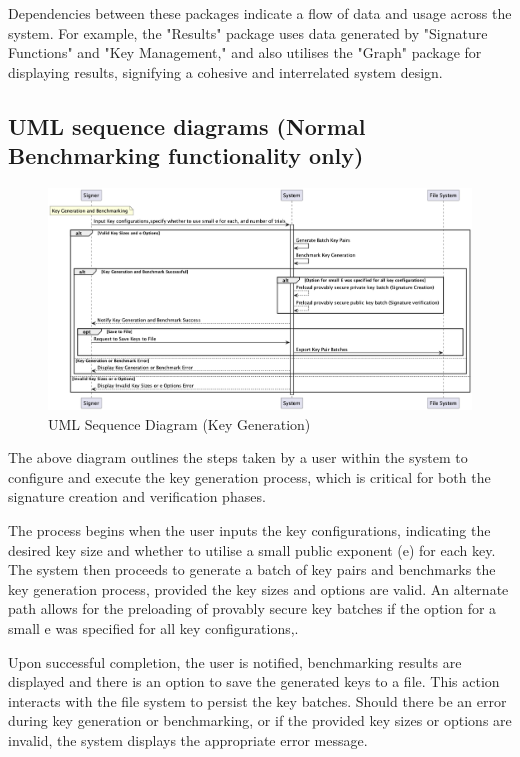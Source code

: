 \documentclass[]{final_report}
\theoremstyle{definition}
\begin{document}
Dependencies between these packages indicate a flow of data and usage across the system. For example, the "Results" package uses data generated by "Signature Functions" and "Key Management," and also utilises the "Graph" package for displaying results, signifying a cohesive and interrelated system design.


\subsection{UML sequence diagrams (Normal Benchmarking functionality only)}
\begin{figure}[H]
    \centering
    \includegraphics[scale=0.42]{main_pictures/sequenceKey.png}
    \caption{UML Sequence Diagram (Key Generation)}
    \label{fig:uc}
\end{figure}

The above diagram outlines the steps taken by a user within the system to configure and execute the key generation process, which is critical for both the signature creation and verification phases.

The process begins when the user inputs the key configurations, indicating the desired key size and whether to utilise a small public exponent (e) for each key. The system then proceeds to generate a batch of key pairs and benchmarks the key generation process, provided the key sizes and options are valid. An alternate path allows for the preloading of provably secure key batches if the option for a small e was specified for all key configurations,.

Upon successful completion, the user is notified, benchmarking results are displayed and there is an option to save the generated keys to a file. This action interacts with the file system to persist the key batches. Should there be an error during key generation or benchmarking, or if the provided key sizes or options are invalid, the system displays the appropriate error message.
\end{document}
